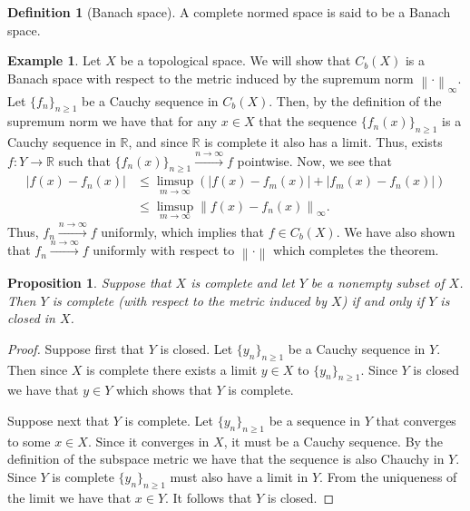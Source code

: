 \documentclass[11pt,a4paper]{article}
\theoremstyle{definition}
\newtheorem{definition}{Definition}[section]
\newtheorem{example}{Example}[section]
\theoremstyle{plain}
\newtheorem{proposition}[theorem]{Proposition}
\newcommand{\R}{\mathbb{R}}
\newcommand{\abs}[1]{\left\lvert #1\right\rvert}
\newcommand{\norm}[1]{\left\lVert #1\right\rVert}
\begin{document}
  \begin{definition}[Banach space]
    A complete normed space is said to be a Banach space.
  \end{definition}

  \begin{example}
    Let $X$ be a topological space. We will show that $C_b(X)$ is a Banach
    space with respect to the metric induced by the supremum norm 
    $\norm{\cdot}_{\infty}$. Let $\{f_n\}_{n \geq 1}$ be a Cauchy sequence
    in $C_b(X)$. Then, by the definition of the supremum norm we have that
    for any $x \in X$ that the sequence $\{f_n(x)\}_{n \geq 1}$ is a Cauchy
    sequence in $\R$, and since $\R$ is complete it also has a limit.
    Thus, exists $f \colon Y \to \R$ such that 
    $\{f_n(x)\}_{n \geq 1} \xrightarrow{n \to \infty} f$ pointwise.
    Now, we see that
    \begin{align*}
      \abs{f(x) - f_n(x)} &\le
      \limsup_{m \to \infty}(\abs{f(x) - f_m(x)} + \abs{f_m(x) - f_n(x)}) \\
      &\le \limsup_{m \to \infty} \norm{f(x) - f_n(x)}_{\infty}.
    \end{align*}
    Thus, $f_n \xrightarrow{n \to \infty} f$ uniformly,
    which implies that $f \in C_b(X)$. We have also shown that
    $f_n \xrightarrow{n \to \infty} f$ uniformly with respect to $\norm{\cdot}$
    which completes the theorem.
  \end{example}

  \begin{proposition}
    Suppose that $X$ is complete and let $Y$ be a nonempty subset of $X$. 
    Then $Y$ is complete (with respect to the metric induced by $X$) if and 
    only if $Y$ is closed in $X$.
  \end{proposition}
  \begin{proof}
    Suppose first that $Y$ is closed. Let $\{y_n\}_{n \geq 1}$ be a Cauchy
    sequence in $Y$. Then since $X$ is complete there exists a limit $y \in X$
    to $\{y_n\}_{n \geq 1}$. Since $Y$ is closed we have that $y \in Y$
    which shows that $Y$ is complete.

    Suppose next that $Y$ is complete. Let $\{y_n\}_{n \geq 1}$ be a sequence
    in $Y$ that converges to some $x \in X$. Since it converges in $X$,
    it must be a Cauchy sequence. By the definition of the subspace metric
    we have that the sequence is also Chauchy in $Y$. Since $Y$ is complete
    $\{y_n\}_{n \geq 1}$ must also have a limit in $Y$. From the uniqueness
    of the limit we have that $x \in Y$. It follows that $Y$ is closed.
  \end{proof}
  
\end{document}
